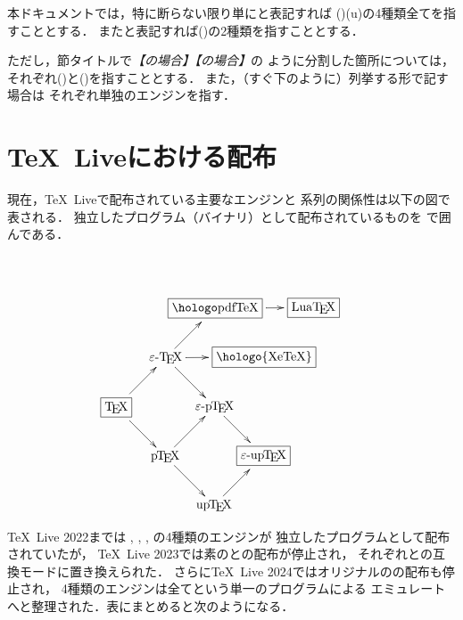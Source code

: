 \documentclass[a4paper,11pt,nomag,dvipdfmx]{jsarticle}
\begin{document}
本ドキュメントでは，特に断らない限り単に\pTeX と表記すれば
(\eTeXpre)(u)\pTeX の4種類全てを指すこととする．
また\upTeX と表記すれば(\eTeXpre)\upTeX の2種類を指すこととする．

ただし，節タイトルで\emph{【\pTeX の場合】【\upTeX の場合】}の
ように分割した箇所については，
それぞれ(\eTeXpre)\pTeX と(\eTeXpre)\upTeX を指すこととする．
また，（すぐ下のように）列挙する形で記す場合は
それぞれ単独のエンジンを指す．

\section*{\TeX~Liveにおける配布}
\def\MODEext{{\tiny 拡張モード}}
現在，\TeX~Liveで配布されている主要なエンジンと
\pTeX 系列の関係性は以下の図で表される．
独立したプログラム（バイナリ）として配布されているものを
で囲んである．\par\vskip-35pt
\[
\xymatrix@ur{
 \text{\fbox{\TeX}}   \ar[r]\ar[d] & \text{\eTeX}   \ar[r]\ar[d]\ar[rd]
   & \text{\fbox{\pdfTeX}} \ar[rd] & \\
 \text{\pTeX}  \ar[r]\ar[d] & \text{\epTeX} \ar[d]
   & \text{\fbox{\hologo{XeTeX}}}       & \text{\fbox{Lua\TeX}} \\
 \text{\upTeX} \ar[r]       & \text{\fbox{\eupTeX}} & & %
}
\]

\TeX~Live 2022までは
\pTeX, \upTeX, \epTeX, \eupTeX の4種類のエンジンが
独立したプログラムとして配布されていたが，
\TeX~Live 2023では素の\pTeX と\upTeX の配布が停止され，
それぞれ\epTeX と\eupTeX の互換モードに置き換えられた．
さらに\TeX~Live 2024ではオリジナルの\epTeX の配布も停止され，
4種類のエンジンは全て\eupTeX という単一のプログラムによる
エミュレートへと整理された．表にまとめると次のようになる．
\end{document}
